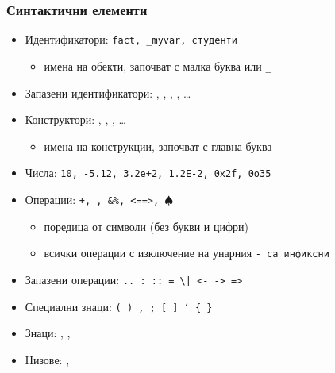 \documentclass[alsotrans,beameroptions={aspectratio=169}]{beamerswitch}
\begin{document}
\begin{frame}[fragile]
  \frametitle{Синтактични елементи}

  \begin{itemize}[<+->]
  \item Идентификатори: \tt{fact}, \tt{\_myvar}, \tt{студенти}
    \begin{itemize}
    \item имена на обекти, започват с малка буква или \tt\_
    \end{itemize}
  \item Запазени идентификатори: , , , , \ldots
  \item Конструктори: , , , \ldots
    \begin{itemize}
    \item имена на конструкции, започват с главна буква
    \end{itemize}
  \item Числа: \tt{10}, \tt{-5.12}, \tt{3.2e+2}, \tt{1.2E-2}, \tt{0x2f}, \tt{0o35}
  \item Операции: \tt+, \tt*, \tt{\&\%}, \tt{<==>}, \tt{$\spadesuit$}
    \begin{itemize}
    \item поредица от символи (без букви и цифри)
    \item всички операции с изключение на унарния \tt- са инфиксни
    \end{itemize}
  \item Запазени операции: \tt{..} \tt: \tt{::} \tt= \tt\textbackslash \tt| \tt{<-} \tt{->} \tt@ \tt\~ \tt{=>}
  \item Специални знаци: \tt( \tt) \tt, \tt; \tt[ \tt] \tt` \tt\{ \tt\}
  \item Знаци: , , 
  \item Низове: , 
  \end{itemize}
\end{frame}
\end{document}
